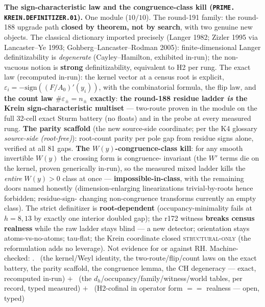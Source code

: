 \documentclass[11pt,a4paper]{article}
\theoremstyle{definition}
\begin{document}
\par\smallskip\noindent\textbf{The sign-characteristic law and
the congruence-class kill (\texttt{PRIME.\allowbreak
KREIN.\allowbreak DEFINITIZER.01}).}
One module ($10/10$).  The round-191 family: the round-188
upgrade path \textbf{closed by theorem, not by search}, with two
genuine new objects.  The classical dictionary imported precisely
(Langer 1982; Zizler 1995 via Lancaster--Ye 1993;
Gohberg--Lancaster--Rodman 2005): finite-dimensional Langer
definitizability is \emph{degenerate} (Cayley--Hamilton,
exhibited in-run); the non-vacuous notion is \textbf{strong}
definitizability, equivalent to H2 per rung.  The exact law
(recomputed in-run): the kernel vector at a census root is
explicit, $\varepsilon_i = -\mathrm{sign}((F/A_0)'(y_i))$, with
the combinatorial formula, the flip law, and \textbf{the count
law $\#\varepsilon_{\pm} = n_{\pm}$ exactly}: \textbf{the
round-188 residue ladder \emph{is} the Krein sign-characteristic
multiset} --- two-route proven in the module on the full 32-cell
exact Sturm battery (no floats) and in the probe at every
measured rung.  \textbf{The parity scaffold} (the new source-side
coordinate; per the K4 glossary \emph{source-side (root-free)}):
root-count parity per pole gap from residue signs alone, verified
at all 81 gaps.  \textbf{The $W(y)$-congruence-class kill}: for
any smooth invertible $W(y)$ the crossing form is congruence-
invariant (the $W'$ terms die on the kernel, proven generically
in-run), so the measured mixed ladder kills the \emph{entire}
$W(y) > 0$ class at once --- \textbf{impossible-in-class}, with
the remaining doors named honestly (dimension-enlarging
linearizations trivial-by-roots hence forbidden; residue-sign-
changing non-congruence transforms currently an empty class).
The strict definitizer is \textbf{root-dependent}
(occupancy-minimality fails at $h = 8, 13$ by exactly one
interior doubled gap); the r172 witness \textbf{breaks census
realness} while the raw ladder stays blind --- a new detector;
orientation stays atoms-vs-no-atoms; tau-flat; the Krein
coordinate closed \textsc{structural-only} (the reformulation
adds no leverage).  Not evidence for or against RH.
Machine-checked: .
\mE\ (the kernel/Weyl identity, the two-route/flip/count laws on
the exact battery, the parity scaffold, the congruence lemma, the
CH degeneracy --- exact, recomputed in-run) $+$ \mC\ (the
$d_h$/occupancy/family/witness/world tables, per record, typed
measured) $+$ \mO\ (H2-cofinal in operator form $==$ realness ---
open, typed)
\par\smallskip
\end{document}
